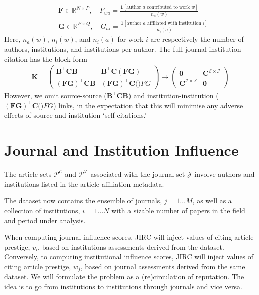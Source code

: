 \documentclass[10pt]{article}
\begin{document}
\begin{align}
	&\mathbf{F} \in \mathbb{R}^{N \times P}, \quad F_{wa} = \frac{\mathbf{1}[\text{author $a$ contributed to work $w$}]}{n_a(w)} \\
	&\mathbf{G} \in \mathbb{R}^{P \times Q}, \quad G_{ai} = \frac{\mathbf{1}[\text{author $a$ affiliated with institution $i$}]}{n_i(a)}
\end{align}
Here, $n_a(w)$, $n_i(w)$, and $n_i(a)$ for work $i$ are respectively the number of authors, institutions, and institutions per author. The full journal-institution citation has the block form
\begin{align}
\mathbf{K} = 
\begin{pmatrix}
	\mathbf{B}^\top \mathbf{C} \mathbf{B} & \mathbf{B}^\top \mathbf{C} (\mathbf{FG}) \\
	(\mathbf{FG})^\top \mathbf{C} \mathbf{B} & (\mathbf{FG})^\top \mathbf{C} (\mathbf){FG} 
\end{pmatrix} \rightarrow
\begin{pmatrix}
		\mathbf{0} & \mathbf{C}^{\mathcal{S \times I}} \\
		\mathbf{C}^{\mathcal{I \times S}} & \mathbf{0}
		\end{pmatrix}
\end{align}
However, we omit source-source ($\mathbf{B}^\top \mathbf{C} \mathbf{B}$) and institution-institution ($(\mathbf{FG})^\top \mathbf{C} (\mathbf){FG} $) links, in the expectation that this will minimise any adverse effects of source and institution `self-citations.' 

\section{Journal and Institution Influence}

The article sets $\mathcal{P^C}$ and $\mathcal{P^T}$ associated with the journal set  $\mathcal{J}$ involve authors and institutions listed in the article affiliation metadata.

 The dataset now contains the ensemble of journals,
 $j=1\ldots M$, as well as a collection of institutions, $i=1\ldots N$ with a sizable number of papers  in the field and period under analysis.

When computing journal influence scores, JIRC will inject  values of citing article prestige, $v_i$, based on institutions assessments derived from the  dataset. Conversely, to
 computing institutional influence scores, JIRC will inject  values of citing article prestige, $w_j$, based on journal assessments derived from the same dataset.
We will formulate the problem as a (re)circulation of reputation. The idea is to go from institutions to institutions through journals and vice versa.
\end{document}
